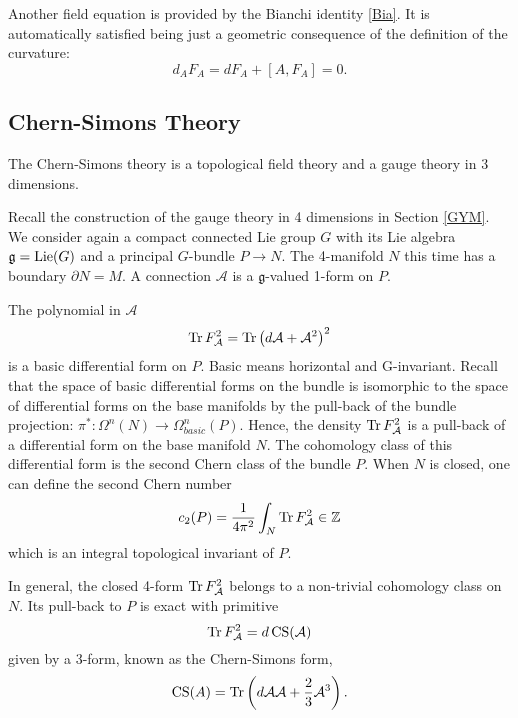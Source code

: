 \documentclass[11pt]{report}
\theoremstyle{plain}
\theoremstyle{definition}
\theoremstyle{remark}
\theoremstyle{remark}
\numberwithin{equation}{section}
\begin{document}
Another field equation is provided by the Bianchi identity \eqref{Bia}. It is automatically satisfied being just a geometric consequence of the definition of the curvature:
\begin{equation}
d_AF_A = d F_A + [A, F_A] = 0.
\end{equation}





\subsection{Chern-Simons Theory}\label{CST}

The Chern-Simons theory is a topological field theory and a gauge theory in 3 dimensions. 

Recall the construction of the gauge theory in 4 dimensions in Section \ref{GYM}. We consider again a compact connected Lie group $G$ with its Lie algebra $\mathfrak{g}={\rm Lie}(G)$ and a principal $G$-bundle $P \to N$. The 4-manifold $N$ this time has a boundary $\partial N = M$.  A connection $\mathcal{A}$ is a $\mathfrak{g}$-valued 1-form on $P$.

The polynomial in $\mathcal{A}$  
%
\begin{equation}
{\rm Tr} \, F_{\mathcal{A}}^2 = {\rm Tr} \left( d\mathcal{A} + \mathcal{A}^2 \right)^2
\end{equation}
is a basic differential form on $P$. Basic means horizontal and G-invariant. Recall that the space of basic differential forms on the bundle is isomorphic to the space of differential forms on the base manifolds by the pull-back of the bundle projection: $\pi^*: \Omega^n(N) \to \Omega^n_{basic}(P)$. Hence, the density ${\rm Tr} \, F_{\mathcal{A}}^2$ is a pull-back of a differential form on the base manifold $N$. The cohomology class of this differential form is the second Chern class of the bundle $P$. When $N$ is closed, one can define  the second Chern number 
%
\begin{equation}
c_2(P) = \frac{1}{4\pi^2} \int_N {\rm Tr} \, F_{\mathcal{A}}^2 \in \mathbb{Z}
\end{equation}
which is an integral topological invariant of $P$.


In general, the closed 4-form ${\rm Tr} \, F_{\mathcal{A}}^2$  belongs to a non-trivial cohomology class on $N$. Its pull-back to $P$ is exact with primitive
%
\begin{equation}\label{CS}
{\rm Tr} \, F_{\mathcal{A}}^2 = d \, {\rm CS}(\mathcal{A})
\end{equation}
given by a 3-form, known as the Chern-Simons form, 
%
\begin{equation}   
{\rm CS}(A)= {\rm Tr} \left( d\mathcal{A}\mathcal{A} + \frac{2}{3} \mathcal{A}^3 \right).
\end{equation}
\end{document}
